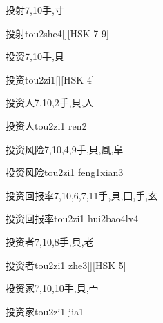\begin{Entry}{投射}{7,10}{⼿,⼨}
  \begin{Phonetics}{投射}{tou2she4}[][HSK 7-9]
  \end{Phonetics}
\end{Entry}

\begin{Entry}{投资}{7,10}{⼿,⾙}
  \begin{Phonetics}{投资}{tou2zi1}[][HSK 4]
  \end{Phonetics}
\end{Entry}

\begin{Entry}{投资人}{7,10,2}{⼿,⾙,⼈}
  \begin{Phonetics}{投资人}{tou2zi1 ren2}
  \end{Phonetics}
\end{Entry}

\begin{Entry}{投资风险}{7,10,4,9}{⼿,⾙,⾵,⾩}
  \begin{Phonetics}{投资风险}{tou2zi1 feng1xian3}
  \end{Phonetics}
\end{Entry}

\begin{Entry}{投资回报率}{7,10,6,7,11}{⼿,⾙,⼞,⼿,⽞}
  \begin{Phonetics}{投资回报率}{tou2zi1 hui2bao4lv4}
  \end{Phonetics}
\end{Entry}

\begin{Entry}{投资者}{7,10,8}{⼿,⾙,⽼}
  \begin{Phonetics}{投资者}{tou2zi1 zhe3}[][HSK 5]
  \end{Phonetics}
\end{Entry}

\begin{Entry}{投资家}{7,10,10}{⼿,⾙,⼧}
  \begin{Phonetics}{投资家}{tou2zi1 jia1}
  \end{Phonetics}
\end{Entry}

